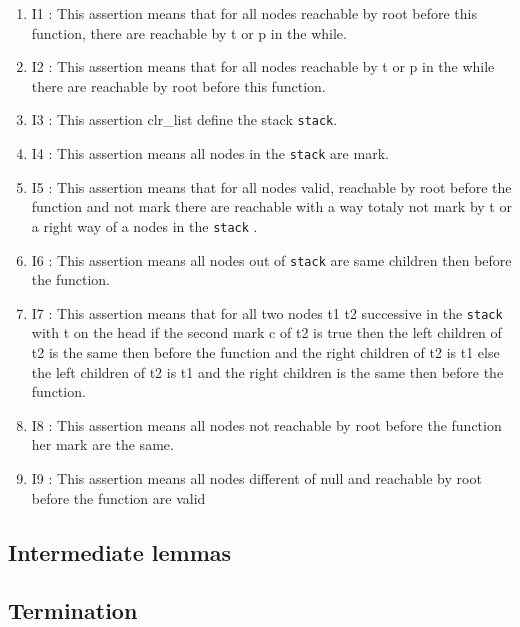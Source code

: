 \begin {enumerate}
\item {I1} : This assertion means that for all nodes reachable by root
  before this function, there are reachable by t or p in the while.
\item {I2} : This assertion means that for all nodes reachable by t or
  p in the while there are reachable by root before this function.
\item {I3} : This assertion clr\_list define the stack \texttt{stack}.
\item {I4} : This assertion means all nodes in the
  \texttt{stack} are mark.
\item {I5} : This assertion means that for all nodes valid, reachable by root
  before the function and not mark there are reachable with a way
  totaly not mark by t or a right way of a nodes in the \texttt{stack} .
\item {I6} : This assertion means all nodes out of \texttt{stack} are
  same children then before the function. 
\item {I7} : This assertion means that for all two nodes t1 t2 successive in
  the \texttt{stack} with t on the head if the second mark c of t2 is
  true then the left children of t2 is the same then before the
  function and the right children of t2 is t1 else the left children
  of t2 is t1 and the right children  is the same then before the
  function.
\item {I8} : This assertion means all nodes not reachable by root before the
  function her mark are the same.
\item {I9} :  This assertion means all nodes different of null and
  reachable by root before the function are valid
\end{enumerate}
\subsection{Intermediate lemmas}

\subsection{Termination}

